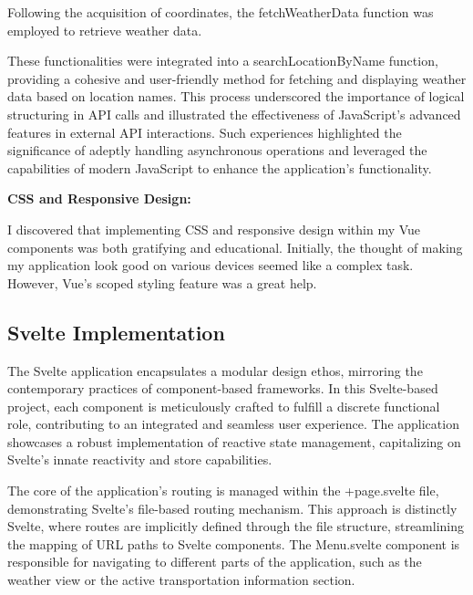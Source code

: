 Following the acquisition of coordinates, the fetchWeatherData function was employed to retrieve weather data. 

These functionalities were integrated into a searchLocationByName function, providing a cohesive and user-friendly method for fetching and displaying weather data based on location names. This process underscored the importance of logical structuring in API calls and illustrated the effectiveness of JavaScript's advanced features in external API interactions. Such experiences highlighted the significance of adeptly handling asynchronous operations and leveraged the capabilities of modern JavaScript to enhance the application's functionality.



\textbf{CSS and Responsive Design:}

I discovered that implementing CSS and responsive design within my Vue components was both gratifying and educational. Initially, the thought of making my application look good on various devices seemed like a complex task. However, Vue's scoped styling feature was a great help. 

\subsection{Svelte Implementation}

The Svelte application encapsulates a modular design ethos, mirroring the contemporary practices of component-based frameworks. In this Svelte-based project, each component is meticulously crafted to fulfill a discrete functional role, contributing to an integrated and seamless user experience. The application showcases a robust implementation of reactive state management, capitalizing on Svelte's innate reactivity and store capabilities.



The core of the application's routing is managed within the +page.svelte file, demonstrating Svelte's file-based routing mechanism. This approach is distinctly Svelte, where routes are implicitly defined through the file structure, streamlining the mapping of URL paths to Svelte components. The Menu.svelte component is responsible for navigating to different parts of the application, such as the weather view or the active transportation information section.



